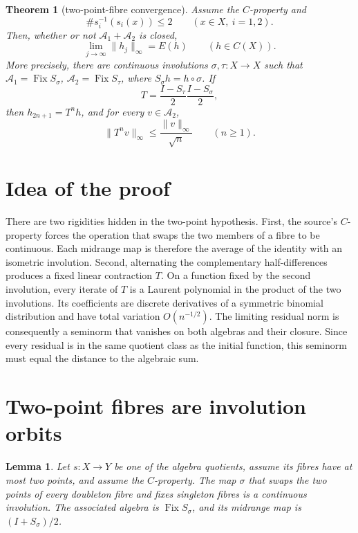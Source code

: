 \documentclass[11pt]{article}
\newtheorem{theorem}{Theorem}
\newtheorem{lemma}{Lemma}
\theoremstyle{remark}
\newcommand{\A}{\mathcal A}
\newcommand{\C}{C(X)}
\newcommand{\Fix}{\operatorname{Fix}}
\begin{document}
\begin{theorem}[two-point-fibre convergence]\label{thm:main}
Assume the $C$-property and
\[
 \#s_i^{-1}(s_i(x))\le2\qquad(x\in X,\ i=1,2).
\]
Then, whether or not $\A_1+\A_2$ is closed,
\[
 \lim_{j\to\infty}\|h_j\|_\infty=E(h)
 \qquad(h\in\C).
\]
More precisely, there are continuous involutions $\sigma,\tau:X\to X$
such that $\A_1=\Fix S_\sigma$, $\A_2=\Fix S_\tau$, where
$S_\sigma h=h\circ\sigma$.  If
\[
 T=\frac{I-S_\tau}{2}\frac{I-S_\sigma}{2},
\]
then $h_{2n+1}=T^nh$, and for every $v\in\A_2$,
\begin{equation}\label{eq:rate}
 \|T^nv\|_\infty\le \frac{\|v\|_\infty}{\sqrt n}
 \qquad(n\ge1).
\end{equation}
\end{theorem}

\section*{Idea of the proof}

There are two rigidities hidden in the two-point hypothesis.  First, the
source's $C$-property forces the operation that swaps the two members of a
fibre to be continuous.  Each midrange map is therefore the average of the
identity with an isometric involution.  Second, alternating the complementary
half-differences produces a fixed linear contraction $T$.  On a function
fixed by the second involution, every iterate of $T$ is a Laurent polynomial
in the product of the two involutions.  Its coefficients are discrete
derivatives of a symmetric binomial distribution and have total variation
$O(n^{-1/2})$.  The limiting residual norm is consequently a seminorm that
vanishes on both algebras and their closure.  Since every residual is in the
same quotient class as the initial function, this seminorm must equal the
distance to the algebraic sum.

\section{Two-point fibres are involution orbits}

\begin{lemma}\label{lem:involution}
Let $s:X\to Y$ be one of the algebra quotients, assume its fibres have at
most two points, and assume the $C$-property.  The map $\sigma$ that swaps
the two points of every doubleton fibre and fixes singleton fibres is a
continuous involution.  The associated algebra is $\Fix S_\sigma$, and its
midrange map is $(I+S_\sigma)/2$.
\end{lemma}
\end{document}
